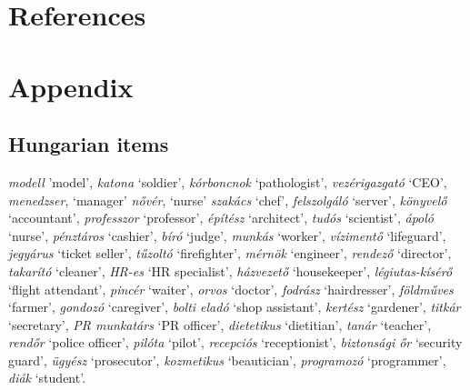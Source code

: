 \documentclass[runningheads]{llncs}
\begin{document}

\section*{References}\label{sec:reference}
\renewcommand{\bibsection}{}








\appendix

\section{Appendix}\label{sec:appendix}

\subsection{Hungarian items}\label{sec:hungarian_items}

\textit{modell} 'model', \textit{katona} `soldier', \textit{kórboncnok} `pathologist', \textit{vezérigazgató} `CEO', \textit{menedzser}, `manager' \textit{nővér}, `nurse' \textit{szakács} `chef', \textit{felszolgáló} `server', \textit{könyvelő} `accountant', \textit{professzor} `professor', \textit{építész} `architect', \textit{tudós} `scientist', \textit{ápoló} `nurse', \textit{pénztáros} `cashier', \textit{bíró} `judge', \textit{munkás} `worker', \textit{vízimentő} `lifeguard', \textit{jegyárus} `ticket seller', \textit{tűzoltó} `firefighter', \textit{mérnök} `engineer', \textit{rendező} `director', \textit{takarító} `cleaner', \textit{HR-es} `HR specialist', \textit{házvezető} `housekeeper', \textit{légiutas-kísérő} `flight attendant', \textit{pincér} `waiter', \textit{orvos} `doctor', \textit{fodrász} `hairdresser', \textit{földműves} `farmer', \textit{gondozó} `caregiver', \textit{bolti eladó} `shop assistant', \textit{kertész} `gardener', \textit{titkár} `secretary', \textit{PR munkatárs} `PR officer', \textit{dietetikus} `dietitian', \textit{tanár} `teacher', \textit{rendőr} `police officer', \textit{pilóta} `pilot', \textit{recepciós} `receptionist', \textit{biztonsági őr} `security guard', \textit{ügyész} `prosecutor', \textit{kozmetikus} `beautician', \textit{programozó} `programmer', \textit{diák} `student'.
\end{document}
